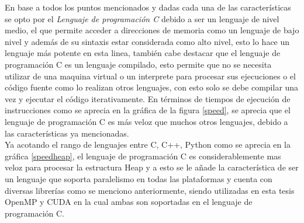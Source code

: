 En base a todos los puntos mencionados y dadas cada una de las características se opto por el \textit{Lenguaje de programación C} debido a ser un lenguaje de nivel medio, el que permite acceder a direcciones de memoria como un lenguaje de bajo nivel y además de su sintaxis estar considerada como alto nivel, esto lo hace un lenguaje más potente  en esta linea, también cabe destacar que el lenguaje de programación C es un lenguaje compilado, esto permite que no se necesita utilizar de una maquina virtual o un interprete para procesar sus ejecuciones o el código fuente como lo realizan otros lenguajes, con esto solo se debe compilar una vez y ejecutar el código iterativamente. En términos de tiempos de ejecución de instrucciones como se aprecia en la gráfica de la figura \ref{speed}, se aprecia que el lenguaje de programación C es más veloz que muchos otros lenguajes, debido a las características ya mencionadas.\\
Ya acotando el rango de lenguajes entre C, C++, Python como se aprecia en la gráfica \ref{speedheap}, el lenguaje de programación C es considerablemente mas veloz para procesar la estructura Heap y a esto se le añade la característica de ser un lenguaje que soporta paralelismo en todas las plataformas y cuenta con diversas librerías como se menciono anteriormente, siendo utilizadas en esta tesis OpenMP y CUDA en la cual ambas son soportadas en el lenguaje de programación C.
